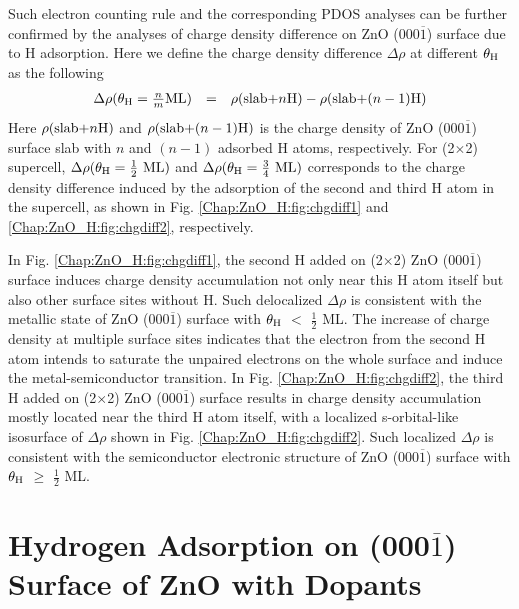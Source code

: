 Such electron counting rule and the corresponding \ac{PDOS} analyses can be further confirmed by the analyses of charge density difference on ZnO (000$\overline{1}$) surface due to H adsorption. Here we define the charge density difference $\Delta\rho$ at different $\theta_{\textup{H}}$ as the following
\begin{equation}
  \begin{array}{rcl}
    \Delta\rho(\theta_{\textup{H}}=\frac{n}{m}\textup{ML})&=&\rho(\textup{slab+}n\textup{H})-\rho(\textup{slab+}(n-1)\textup{H})
  \end{array}
  \label{eq2}
\end{equation}
Here $\rho(\textup{slab+}n \textup{H})$ and $\rho(\textup{slab+}(n-1) \textup{H})$ is the charge density of ZnO (000$\overline{1}$) surface slab with $n$ and $(n-1)$ adsorbed H atoms, respectively. For (2$\times$2) supercell, $\Delta\rho(\theta_{\textup{H}}= \frac{1}{2} \textup{ ML})$ and  $\Delta\rho(\theta_{\textup{H}}= \frac{3}{4} \textup{ ML})$ corresponds to the charge density difference induced by the adsorption of the second and third H atom in the supercell, as shown in Fig. \ref{Chap:ZnO_H:fig:chgdiff1} and  \ref{Chap:ZnO_H:fig:chgdiff2}, respectively. 

In Fig. \ref{Chap:ZnO_H:fig:chgdiff1}, the second H added on (2$\times$2) ZnO (000$\overline{1}$) surface induces charge density accumulation not only near this H atom itself but also other surface sites without H. Such delocalized $\Delta\rho$ is consistent with the metallic state of ZnO (000$\overline{1}$) surface with $\theta_{\textup{H}}$ $<$ $\frac{1}{2}$ ML. The increase of charge density at multiple surface sites indicates that the electron from the second H atom intends to saturate the unpaired electrons on the whole surface and induce the metal-semiconductor transition. In Fig. \ref{Chap:ZnO_H:fig:chgdiff2}, the third H added on (2$\times$2) ZnO (000$\overline{1}$) surface results in charge density accumulation mostly located near the third H atom itself, with a localized s-orbital-like isosurface of $\Delta\rho$ shown in Fig. \ref{Chap:ZnO_H:fig:chgdiff2}. Such localized $\Delta\rho$ is consistent with the semiconductor electronic structure of ZnO (000$\overline{1}$) surface with $\theta_{\textup{H}}$ $\geq$ $\frac{1}{2}$ ML. 



\section{Hydrogen Adsorption on (000$\overline{1}$) Surface of ZnO with Dopants}
\label{sec:doped}

